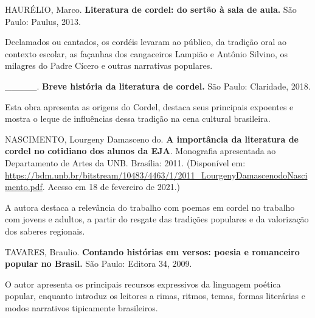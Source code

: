 \documentclass[12pt]{extarticle}
\begin{document}
  HAURÉLIO, Marco. \textbf{Literatura de cordel: do sertão à sala de
  aula.} São Paulo: Paulus, 2013.

Declamados ou cantados, os cordéis levaram ao público, da tradição oral
ao contexto escolar, as façanhas dos cangaceiros Lampião e Antônio
Silvino, os milagres do Padre Cícero e outras narrativas populares.


  \_\_\_\_\_. \textbf{Breve história da literatura de cordel.} São
  Paulo: Claridade, 2018.

Esta obra apresenta as origens do Cordel, destaca seus principais
expoentes e mostra o leque de influências dessa tradição na cena
cultural brasileira.


  NASCIMENTO, Lourgeny Damasceno do. \textbf{A importância da literatura
  de cordel no cotidiano dos alunos da EJA}. Monografia apresentada ao
  Departamento de Artes da UNB. Brasília: 2011. (Disponível em:
  \url{https://bdm.unb.br/bitstream/10483/4463/1/2011_LourgenyDamascenodoNascimento.pdf}.
  Acesso em 18 de fevereiro de 2021.)

A autora destaca a relevância do trabalho com poemas em cordel no
trabalho com jovens e adultos, a partir do resgate das tradições
populares e da valorização dos saberes regionais.


  TAVARES, Braulio. \textbf{Contando histórias em versos: poesia e
  romanceiro popular no Brasil.} São Paulo: Editora 34, 2009.

O autor apresenta os principais recursos expressivos da linguagem
poética popular, enquanto introduz os leitores a rimas, ritmos, temas,
formas literárias e modos narrativos tipicamente brasileiros.
\end{document}
